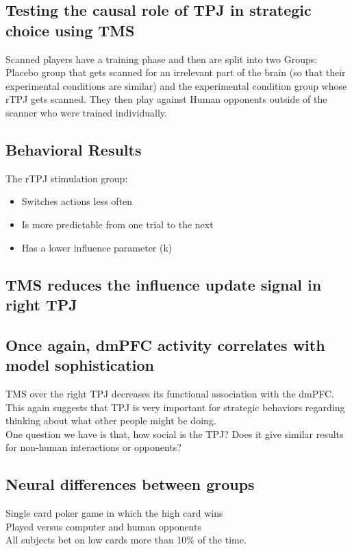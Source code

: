 \subsection{Testing the causal role of TPJ in strategic choice using TMS}
Scanned players have a training phase and then are split into two Groups: Placebo group that gets scanned for an irrelevant part of the brain (so that their experimental conditions are similar) and the experimental condition group whose rTPJ gets scanned. They then play against Human opponents outside of the scanner who were trained individually.
\subsection{Behavioral Results}
The rTPJ stimulation group:
\begin{itemize}
    \item Switches actions less often
    \item Is more predictable from one trial to the next
    \item Has a lower influence parameter (k)
\end{itemize}

\subsection{TMS reduces the influence update signal in right TPJ}

\subsection{Once again, dmPFC activity correlates with model sophistication}
TMS over the right TPJ decreases its functional association with the dmPFC.
This again suggests that TPJ is very important for strategic behaviors regarding thinking about what other people might be doing.
\\One question we have is that, how social is the TPJ? Does it give similar results for non-human interactions or opponents?

\subsection{Neural differences between groups}
Single card poker game in which the high card wins
\\Played versus computer and human opponents
\\All subjects bet on low cards more than 10$\%$ of the time.
